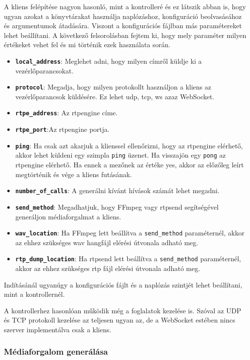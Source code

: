 A kliens felépítése nagyon hasonló, mint a kontrolleré és ez látszik abban is, hogy
ugyan azokat a könyvtárakat használja naplózáshoz, konfiguráció beolvasásához és
argumentumok átadására. Viszont a konfigurációs fájlban más paramétereket lehet 
beállítani. A következő felsorolásban fejtem ki, hogy mely paraméter milyen értékeket 
vehet fel és mi történik ezek használata során. 

\begin{itemize}
	\item \textbf{\texttt{local\_address}}: Meglehet adni, hogy milyen címről küldje
	ki a vezérlőparancsokat.
	\item \textbf{\texttt{protocol}}: Megadja, hogy milyen protokollt használjon a kliens 
	az vezérlőparancsok küldésére. Ez lehet udp, tcp, ws azaz WebSocket.
	\item \textbf{\texttt{rtpe\_address}}: Az rtpengine címe. 
	\item \textbf{\texttt{rtpe\_port}}:Az rtpengine portja.
	\item \textbf{\texttt{ping}}: Ha csak azt akarjuk a klienssel ellenőrizni, hogy az 
	rtpengine elérhető, akkor lehet küldeni egy szimpla \texttt{ping} üzenet. Ha 
	visszajön egy \texttt{pong} az rtpengine elérhető. Ha ennek a mezőnek az értéke yes, 
	akkor az előzőleg leírt megtörténik és vége a kliens futásának. 
	\item \textbf{\texttt{number\_of\_calls}}: A generálni kívánt hívások számát lehet 
	megadni. 
	\item \textbf{\texttt{send\_method}}: Megadhatjuk, hogy FFmpeg vagy rtpsend 
	segítségével generáljon médiaforgalmat a kliens.
	\item \textbf{\texttt{wav\_location}}: Ha FFmpeg lett beállítva a 
	\texttt{send\_method} paraméternél, akkor az ehhez szükséges wav hangfájl elérési 
	útvonala adható meg.
	\item \textbf{\texttt{rtp\_dump\_location}}: Ha rtpsend lett beállítva a 
	\texttt{send\_method} paraméternél, akkor az ehhez szükséges rtp fájl elérési 
	útvonala adható meg.
\end{itemize}

Indításánál ugyanúgy a konfigurációs fájlt és a naplózás szintjét lehet beállítani,
mint a kontrollernél. 

A kontrollerhez hasonlóan működik még a foglalatok kezelése is. Szóval az UDP és TCP 
protokoll kezelése az teljesen ugyan az, de a WebSocket estében nincs szerver 
implementálva csak a kliens. 

\subsubsection{Médiaforgalom generálása}

